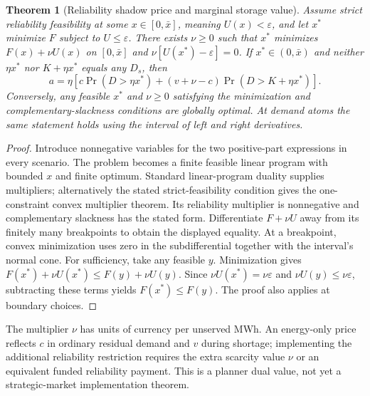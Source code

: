 \documentclass[11pt]{article}
\newtheorem{theorem}{Theorem}
\theoremstyle{definition}
\begin{document}
\begin{theorem}[Reliability shadow price and marginal storage value]
Assume strict reliability feasibility at some $x\in[0,\bar x]$, meaning $U(x)<\varepsilon$, and let $x^*$ minimize $F$ subject to $U\leq\varepsilon$. There exists $\nu\geq0$ such that $x^*$ minimizes $F(x)+\nu U(x)$ on $[0,\bar x]$ and $\nu[U(x^*)-\varepsilon]=0$. If $x^*\in(0,\bar x)$ and neither $\eta x^*$ nor $K+\eta x^*$ equals any $D_s$, then
\[
 a=\eta\left[c\Pr(D>\eta x^*)
                  +(v+\nu-c)\Pr(D>K+\eta x^*)\right].
\]
Conversely, any feasible $x^*$ and $\nu\geq0$ satisfying the minimization and complementary-slackness conditions are globally optimal. At demand atoms the same statement holds using the interval of left and right derivatives.
\end{theorem}
\begin{proof}
Introduce nonnegative variables for the two positive-part expressions in every scenario. The problem becomes a finite feasible linear program with bounded $x$ and finite optimum. Standard linear-program duality supplies multipliers; alternatively the stated strict-feasibility condition gives the one-constraint convex multiplier theorem. Its reliability multiplier is nonnegative and complementary slackness has the stated form. Differentiate $F+\nu U$ away from its finitely many breakpoints to obtain the displayed equality. At a breakpoint, convex minimization uses zero in the subdifferential together with the interval's normal cone.
For sufficiency, take any feasible $y$. Minimization gives $F(x^*)+\nu U(x^*)\leq F(y)+\nu U(y)$. Since $\nu U(x^*)=\nu\varepsilon$ and $\nu U(y)\leq\nu\varepsilon$, subtracting these terms yields $F(x^*)\leq F(y)$. The proof also applies at boundary choices.
\end{proof}
The multiplier $\nu$ has units of currency per unserved MWh. An energy-only price reflects $c$ in ordinary residual demand and $v$ during shortage; implementing the additional reliability restriction requires the extra scarcity value $\nu$ or an equivalent funded reliability payment. This is a planner dual value, not yet a strategic-market implementation theorem.
\end{document}
